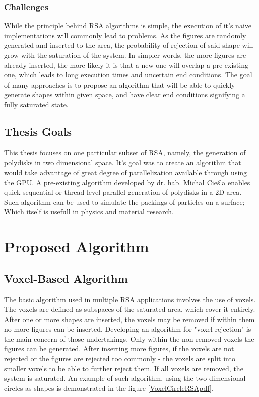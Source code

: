 \documentclass[12pt, oneside]{report}
\begin{document}
\subsection {Challenges}

While the principle behind RSA algorithms is simple, the execution of it's naive implementations will commonly lead to problems. As the figures are randomly generated and inserted to the area, the probability of rejection of said shape will grow with the saturation of the system. In simpler words, the more figures are already inserted, the more likely it is that a new one will overlap a pre-existing one, which leads to long execution times and uncertain end conditions. The goal of many approaches is to propose an algorithm that will be able to quickly generate shapes within given space, and have clear end conditions signifying a fully saturated state.

\section {Thesis Goals}

This thesis focuses on one particular subset of RSA, namely, the generation of polydisks in two dimensional space. It's goal was to create an algorithm that would take advantage of great degree of parallelization available through using the GPU. A pre-existing algorithm developed by dr. hab. Michał Cieśla enables quick sequential or thread-level parallel generation of polydisks in a 2D area. Such algorithm can be used to simulate the packings of particles on a surface; Which itself is usefull in physics and material research.\autocite[1]{ciesla}


\chapter{Proposed Algorithm}

\section {Voxel-Based Algorithm}

The basic algorithm used in multiple RSA applications involves the use of voxels. The voxels are defined as subspaces of the saturated area, which cover it entirely. After one or more shapes are inserted, the voxels may be removed if within them no more figures can be inserted. Developing an algorithm for "voxel rejection" is the main concern of those undertakings. Only within the non-removed voxels the figures can be generated. After inserting more figures, if the voxels are not rejected or the figures are rejected too commonly - the voxels are split into smaller voxels to be able to further reject them. If all voxels are removed, the system is saturated. An example of such algorithm, using the two dimensional circles as shapes is demonstrated in the figure \ref{VoxelCircleRSApdf}.
\end{document}
